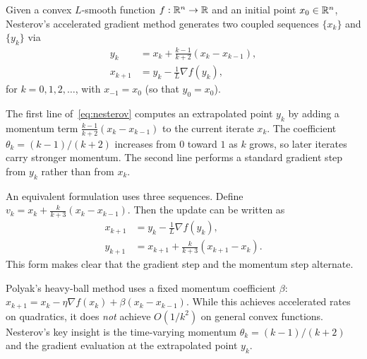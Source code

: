 \documentclass[11pt,a4paper]{article}
\begin{document}
\begin{definition}%
\label{def:nesterov}
Given a convex $L$-smooth function $f : \mathbb{R}^n \to \mathbb{R}$ and an initial
point $x_0 \in \mathbb{R}^n$, Nesterov's accelerated gradient method generates
two coupled sequences $\{x_k\}$ and $\{y_k\}$ via
\begin{equation}\label{eq:nesterov}
\boxed{
\begin{aligned}
  y_k &= x_k + \frac{k-1}{k+2}(x_k - x_{k-1}), \\
  x_{k+1} &= y_k - \frac{1}{L}\nabla f(y_k),
\end{aligned}
}
\end{equation}
for $k = 0, 1, 2, \dots$, with $x_{-1} = x_0$ (so that $y_0 = x_0$).
\end{definition}

\begin{remark}\label{rem:momentum}
The first line of~\eqref{eq:nesterov} computes an extrapolated point
$y_k$ by adding a momentum term $\frac{k-1}{k+2}(x_k - x_{k-1})$ to
the current iterate $x_k$. The coefficient $\theta_k = (k-1)/(k+2)$
increases from $0$ toward $1$ as $k$ grows, so later iterates carry
stronger momentum. The second line performs a standard gradient step
from $y_k$ rather than from $x_k$.
\end{remark}

\begin{remark}\label{rem:alt-form}
An equivalent formulation uses three sequences. Define
$v_k = x_k + \frac{k}{k+3}(x_k - x_{k-1})$. Then the update
can be written as
\begin{equation}\label{eq:nesterov-alt}
\begin{aligned}
  x_{k+1} &= y_k - \frac{1}{L}\nabla f(y_k), \\
  y_{k+1} &= x_{k+1} + \frac{k}{k+3}(x_{k+1} - x_k).
\end{aligned}
\end{equation}
This form makes clear that the gradient step and the momentum step
alternate.
\end{remark}

\begin{remark}\label{rem:heavy-ball}
Polyak's heavy-ball method \citep{polyak1992} uses a fixed momentum
coefficient $\beta$:
$x_{k+1} = x_k - \eta \nabla f(x_k) + \beta(x_k - x_{k-1})$.
While this achieves accelerated rates on quadratics, it does \emph{not}
achieve $O(1/k^2)$ on general convex functions. Nesterov's key insight
is the time-varying momentum $\theta_k = (k-1)/(k+2)$ and the gradient
evaluation at the extrapolated point $y_k$.
\end{remark}
\end{document}
